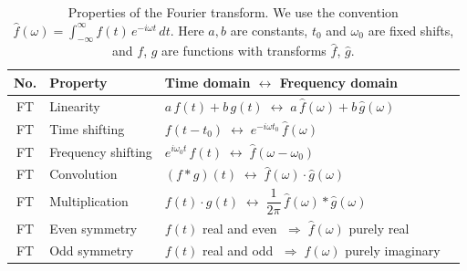 \documentclass[preprint]{aastex702}
\newcommand{\FT}[1]{\hat{#1}}
\newcounter{ftprop}
\renewcommand{\theftprop}{FT\arabic{ftprop}}
\begin{document}
\begin{table}[ht!]
\centering
\caption{Properties of the Fourier transform. We use the convention $\FT{f}(\omega) = \int_{-\infty}^{\infty} f(t)\,e^{-i\omega t}\,dt$. Here $a, b$ are constants, $t_0$ and $\omega_0$ are fixed shifts, and $f$, $g$ are functions with transforms $\FT{f}$, $\FT{g}$.}
\label{tab:fourier_properties}
\setcounter{ftprop}{0}
\begin{tabular}{cllr}
    \hline
    \textbf{No.} & \textbf{Property} & \textbf{Time domain $\longleftrightarrow$ Frequency domain} \\
    \hline
    {ftprop}\label{ft:linearity}\theftprop &
    Linearity &
    $a\,f(t) + b\,g(t) \;\longleftrightarrow\; a\,\FT{f}(\omega) + b\,\FT{g}(\omega)$ \\[8pt]
    {ftprop}\label{ft:timeshift}\theftprop &
    Time shifting &
    $f(t - t_0) \;\longleftrightarrow\; e^{-i\omega t_0}\,\FT{f}(\omega)$ \\[8pt]
    {ftprop}\label{ft:freqshift}\theftprop &
    Frequency shifting &
    $e^{i\omega_0 t}\,f(t) \;\longleftrightarrow\; \FT{f}(\omega - \omega_0)$ \\[8pt]
    {ftprop}\label{ft:convolution}\theftprop &
    Convolution &
    $(f \ast g)(t) \;\longleftrightarrow\; \FT{f}(\omega)\cdot\FT{g}(\omega)$ \\[8pt]
    {ftprop}\label{ft:multiplication}\theftprop &
    Multiplication &
    $f(t)\cdot g(t) \;\longleftrightarrow\; \dfrac{1}{2\pi}\,\FT{f}(\omega) \ast \FT{g}(\omega)$ \\[12pt]
    {ftprop}\label{ft:even}\theftprop &
    Even symmetry &
    $f(t)$ real and even $\;\Longrightarrow\; \FT{f}(\omega)$ purely real \\[8pt]
    {ftprop}\label{ft:odd}\theftprop &
    Odd symmetry &
    $f(t)$ real and odd $\;\Longrightarrow\; \FT{f}(\omega)$ purely imaginary \\[8pt]
    \hline
\end{tabular}
\end{table}
\end{document}
